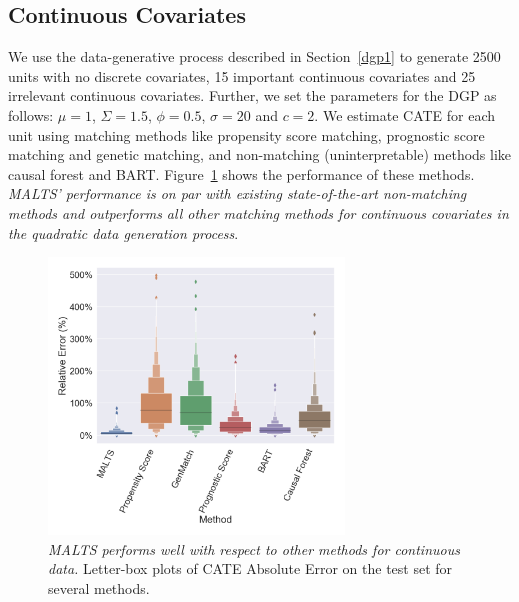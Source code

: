 \subsection{Continuous Covariates}
We use the data-generative process described in Section~\ref{dgp1} to generate 2500 units with no discrete covariates, 15 important continuous covariates and 25 irrelevant continuous covariates. Further, we set the parameters for the DGP as follows:
$\mu = 1$, $\Sigma = 1.5$, $\phi=0.5$, $\sigma = 20$ and $c = 2$.
We estimate CATE for each unit using matching methods like propensity score matching, prognostic score matching and genetic matching, and non-matching (uninterpretable) methods like causal forest and BART. Figure~\ref{fig:continuous} shows the performance of these methods. \textit{MALTS' performance is on par with existing state-of-the-art non-matching methods and outperforms all other matching methods for continuous covariates in the quadratic data generation process}. 

\begin{figure}
     \centering
    \includegraphics[width=0.7\textwidth]{Figures/boxplot_multifold_malts_continuous.png}    \caption{{\textit{\it MALTS performs well with respect to other methods for continuous data.}} Letter-box plots of CATE Absolute Error on the test set for several methods.}
    \label{fig:continuous}
\end{figure}


    
